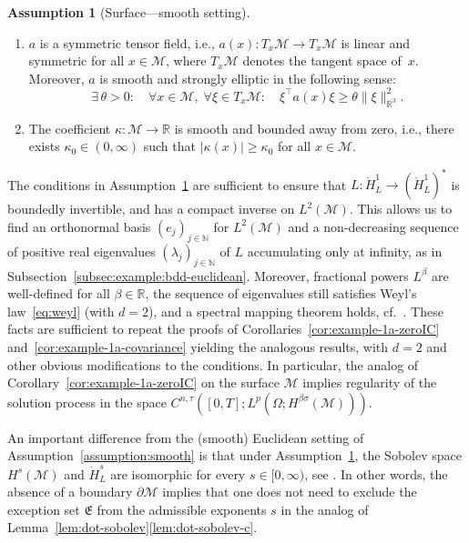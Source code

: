 \documentclass[reqno]{amsart}
\numberwithin{equation}{section}
\newcommand{\R}{\mathbb{R}}
\newcommand{\N}{\mathbb{N}}
\newcommand{\cM}{\mathcal{M}}
\newcommand{\norm}[2]{     \| #1       \|_{ #2 }}
\newcommand{\from}{\colon}
\theoremstyle{remark}
\theoremstyle{definition}
\newtheorem{assumption}[lemma]{Assumption}
\begin{document}
\begin{assumption}[Surface---smooth setting]
	\
	
	\label{assumption:surface-smooth}
	\begin{enumerate}[label=(\roman*), leftmargin=1cm] 
		\item 
		$a$ is a symmetric tensor field,
		i.e., $a(x)\from T_x \cM\to T_x \cM$ is linear
		and symmetric for all $x \in \cM$, where
		$T_x \cM$ denotes the tangent space of~$x$. 
		Moreover, $a$ is smooth and strongly
		elliptic in the following sense:  
		\[ 
		\exists \, \theta > 0: 
		\quad 
		\forall x \in \cM, \; \forall \xi \in T_x\cM : \quad 
		\xi^\top a(x) \xi 
		\geq  
		\theta \norm{\xi}{\R^3}^2.
		\]
		\item 
		The coefficient $\kappa \from \cM \to \R$
		is smooth and 
		bounded away from zero, i.e., 
		there exists $\kappa_0 \in (0,\infty)$ such that
		$|\kappa(x)|\ge \kappa_0$ for all $x \in \cM$.
	\end{enumerate}
\end{assumption}

The conditions in Assumption~\ref{assumption:surface-smooth} 
are sufficient to ensure that
$L \from \dot H_L^1 \to (\dot H_L^{1})^*$ is 
boundedly invertible,  
and has a compact inverse on $L^2(\cM)$. 
This allows us to find an orthonormal basis $(e_j)_{j\in\N}$
for $L^2(\cM)$ and a non-decreasing sequence of positive
real eigenvalues $(\lambda_j)_{j\in\N}$ of
$L$ accumulating only at infinity, 
as in Subsection~\ref{subsec:example:bdd-euclidean}.
Moreover, fractional powers $L^\beta$ are well-defined
for all $\beta\in\R$, the sequence of eigenvalues
still satisfies Weyl's law~\eqref{eq:weyl} (with $d = 2$),
and a spectral mapping theorem holds,
cf.\ \cite[Theorems~XII.1.3~and~XII.2.1]{Taylor1981}.
These facts are sufficient to repeat the proofs of
Corollaries~\ref{cor:example-1a-zeroIC} 
and~\ref{cor:example-1a-covariance} 
yielding the analogous results, with $d = 2$ 
and other obvious modifications to the conditions.
In particular, the analog of Corollary~\ref{cor:example-1a-zeroIC} 
on the surface $\cM$ implies regularity of the solution process in  
the space 
$C^{n,\tau}([0,T]; L^p(\Omega; H^{\beta\sigma}(\cM)))$. 

An important difference from the 
(smooth) Euclidean setting of
Assumption~\ref{assumption:smooth}
is that 
under Assumption~\ref{assumption:surface-smooth},
the Sobolev space $H^s(\cM)$ and  
$\dot H_L^s$ are isomorphic for every $s \in [0,\infty)$,
see \cite[Example~XII.2.1]{Taylor1981}.
In other words, the absence of a boundary $\partial\cM$
implies that one does not need to 
exclude the exception set $\mathfrak{E}$ 
from the admissible exponents $s$
in the analog of Lemma~\ref{lem:dot-sobolev}\ref{lem:dot-sobolev-c}. 
\end{document}
